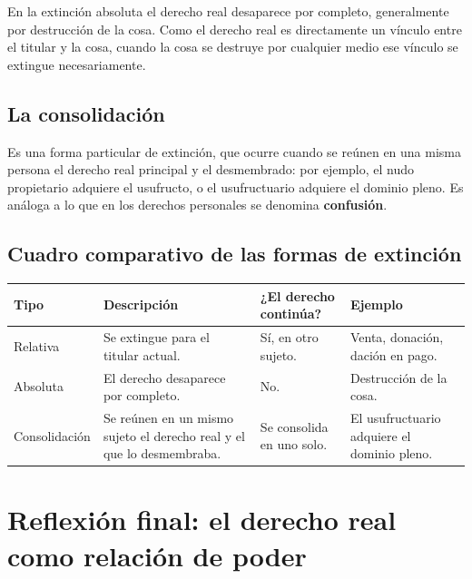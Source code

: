 \documentclass[12pt,oneside]{book}
\begin{document}
En la extinción absoluta el derecho real desaparece por completo, generalmente por destrucción de la cosa. Como el derecho real es directamente un vínculo entre el titular y la cosa, cuando la cosa se destruye por cualquier medio ese vínculo se extingue necesariamente.


\subsection{La consolidación}

Es una forma particular de extinción, que ocurre cuando se reúnen en una misma persona el derecho real principal y el desmembrado: por ejemplo, el nudo propietario adquiere el usufructo, o el usufructuario adquiere el dominio pleno. Es análoga a lo que en los derechos personales se denomina \textbf{confusión}.

\subsection{Cuadro comparativo de las formas de extinción}

\begin{center}
\small
\renewcommand{\arraystretch}{1.3}
\begin{tabularx}{\textwidth}{@{}>{\raggedright\arraybackslash}p{}>{\raggedright\arraybackslash}X>{\raggedright\arraybackslash}p{}>{\raggedright\arraybackslash}p{}@{}}
\toprule
\textbf{Tipo} & \textbf{Descripción} & \textbf{¿El derecho continúa?} & \textbf{Ejemplo} \\
\midrule
Relativa & Se extingue para el titular actual. & Sí, en otro sujeto. & Venta, donación, dación en pago. \\
Absoluta & El derecho desaparece por completo. & No. & Destrucción de la cosa. \\
Consolidación & Se reúnen en un mismo sujeto el derecho real y el que lo desmembraba. & Se consolida en uno solo. & El usufructuario adquiere el dominio pleno. \\
\bottomrule
\end{tabularx}
\end{center}

\section{Reflexión final: el derecho real como relación de poder}
\end{document}
